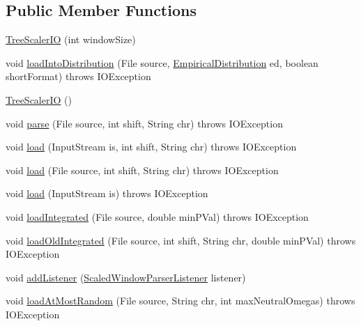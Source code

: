 \subsection*{Public Member Functions}
\begin{DoxyCompactItemize}
\item 
\hyperlink{classbroad_1_1core_1_1siphy_1_1_tree_scaler_i_o_af4595c29a85362a3928f781f1490bc2b}{Tree\+Scaler\+I\+O} (int window\+Size)
\item 
void \hyperlink{classbroad_1_1core_1_1siphy_1_1_tree_scaler_i_o_aa70e17070237a7403cfe8459ea16c495}{load\+Into\+Distribution} (File source, \hyperlink{classbroad_1_1core_1_1math_1_1_empirical_distribution}{Empirical\+Distribution} ed, boolean short\+Format)  throws I\+O\+Exception 
\item 
\hyperlink{classbroad_1_1core_1_1siphy_1_1_tree_scaler_i_o_abd0afc76586d9f957446ae7046ab4d86}{Tree\+Scaler\+I\+O} ()
\item 
void \hyperlink{classbroad_1_1core_1_1siphy_1_1_tree_scaler_i_o_a5dfbfb77c4a3393d4bc01b44c7a74e84}{parse} (File source, int shift, String chr)  throws I\+O\+Exception 
\item 
void \hyperlink{classbroad_1_1core_1_1siphy_1_1_tree_scaler_i_o_af5028b82d4bd9b25fece9d0d56221c9a}{load} (Input\+Stream is, int shift, String chr)  throws I\+O\+Exception 
\item 
void \hyperlink{classbroad_1_1core_1_1siphy_1_1_tree_scaler_i_o_a9b0b493aaec6f66f4a0bce644395dad3}{load} (File source, int shift, String chr)  throws I\+O\+Exception 
\item 
void \hyperlink{classbroad_1_1core_1_1siphy_1_1_tree_scaler_i_o_a8b3a231bde7a21467749657d8c028c22}{load} (Input\+Stream is)  throws I\+O\+Exception 
\item 
void \hyperlink{classbroad_1_1core_1_1siphy_1_1_tree_scaler_i_o_a293cc0f3845656e0ab57b0f8d29dcb6f}{load\+Integrated} (File source, double min\+P\+Val)  throws I\+O\+Exception 
\item 
void \hyperlink{classbroad_1_1core_1_1siphy_1_1_tree_scaler_i_o_aaee98d3d1ff93b15b9f8313a13cef009}{load\+Old\+Integrated} (File source, int shift, String chr, double min\+P\+Val)  throws I\+O\+Exception 
\item 
void \hyperlink{classbroad_1_1core_1_1siphy_1_1_tree_scaler_i_o_a2d49d0f9e468c7ec63d39997e8d1396b}{add\+Listener} (\hyperlink{interfacebroad_1_1core_1_1siphy_1_1_scaled_window_parser_listener}{Scaled\+Window\+Parser\+Listener} listener)
\item 
void \hyperlink{classbroad_1_1core_1_1siphy_1_1_tree_scaler_i_o_a7538edc835b2867a23e91f40b0ed3a78}{load\+At\+Most\+Random} (File source, String chr, int max\+Neutral\+Omegas)  throws I\+O\+Exception

\end{DoxyCompactItemize}
